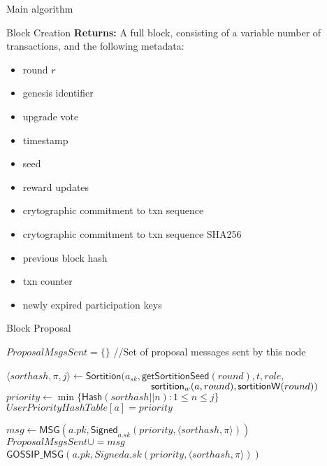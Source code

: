 \documentclass[10pt,a4paper]{article}
\begin{document}
\begin{section}{Main algorithm}
\begin{subsection}{Block Creation}
\noindent \textbf{Returns:} 
A full block, consisting of a variable number of transactions, and the following metadata:
\begin{itemize}
    \item round $r$
    \item genesis identifier
    \item upgrade vote
    \item timestamp
    \item seed
    \item reward updates
    \item crytographic commitment to txn sequence
    \item crytographic commitment to txn sequence SHA256
    \item previous block hash
    \item txn counter
    \item newly expired participation keys
  \end{itemize}

\end{subsection}
\begin{subsection}{Block Proposal}\label{ssect:blockproposal}

\begin{algorithm}
    \begin{algorithmic}[1]
        \State $ProposalMsgsSent = \{\}$ //Set of proposal messages sent by this node

            \State $\langle sorthash, \pi, j\rangle\gets 
            \mathsf{Sortition}(
                a_{sk}, 
                \mathsf{getSortitionSeed}(round), 
                t, 
                role, $ \newline
                ${}$ ${\hskip 5.2cm}\mathsf{sortition}_w(a, round), 
                \mathsf{sortitionW}(round)
            )$
                \State $priority \gets \min\{\mathsf{Hash}(sorthash || n):1\le n\le j\}$
                \State $UserPriorityHashTable[a] = priority$

                \State $msg \gets \mathsf{MSG}(a.pk, \mathsf{Signed}_{a.sk}(priority, \langle sorthash, \pi\rangle))$
                \State $ProposalMsgsSent \cup= msg$
                \State $\mathsf{GOSSIP\_MSG}(a.pk, Signed{a.sk}(priority, \langle sorthash, \pi\rangle))$
            \EndIf
        \EndFor\


\end{algorithmic}
\end{algorithm}
\end{subsection}
\end{section}
\end{document}
